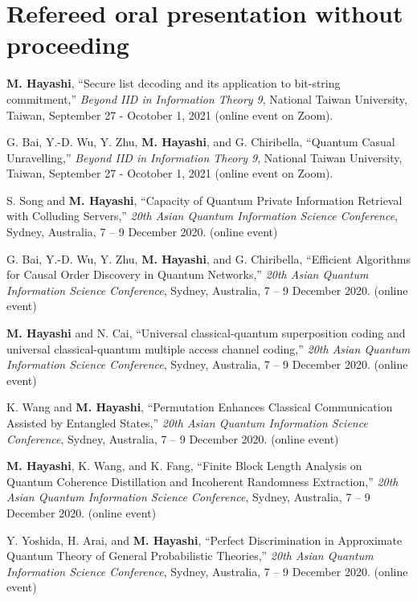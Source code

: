 \documentclass[a4paper,12pt,oneside]{article}
\begin{document}
\section{Refereed oral presentation without proceeding}
\begin{enumerate}

\textbf{M. Hayashi}, 
``Secure list decoding and its application to bit-string commitment,''
{\em Beyond IID in Information Theory 9}, National Taiwan University, Taiwan, September 27 - Ocotober 1, 2021 (online event on Zoom).

G. Bai, Y.-D. Wu, Y. Zhu, \textbf{M. Hayashi}, and G. Chiribella,
``Quantum Casual Unravelling,''
{\em Beyond IID in Information Theory 9}, National Taiwan University, Taiwan, September 27 - Ocotober 1, 2021 (online event on Zoom).

S. Song and \textbf{M. Hayashi},
``Capacity of Quantum Private Information Retrieval with Colluding Servers,''
{\em 20th Asian Quantum Information Science Conference},
Sydney, Australia, 7 -- 9 December 2020. (online event)

G. Bai, Y.-D. Wu, Y. Zhu, \textbf{M. Hayashi}, and G. Chiribella,
``Efficient Algorithms for Causal Order Discovery in Quantum Networks,''
{\em 20th Asian Quantum Information Science Conference},
Sydney, Australia, 7 -- 9 December 2020. (online event)

\textbf{M. Hayashi} and N. Cai,
``Universal classical-quantum superposition coding and universal classical-quantum multiple access channel coding,''
{\em 20th Asian Quantum Information Science Conference},
Sydney, Australia, 7 -- 9 December 2020. (online event)

K. Wang and \textbf{M. Hayashi},
``Permutation Enhances Classical Communication Assisted by Entangled States,''
{\em 20th Asian Quantum Information Science Conference},
Sydney, Australia, 7 -- 9 December 2020. (online event)

\textbf{M. Hayashi}, K. Wang, and K. Fang,
``Finite Block Length Analysis on Quantum Coherence Distillation and Incoherent Randomness Extraction,''
{\em 20th Asian Quantum Information Science Conference},
Sydney, Australia, 7 -- 9 December 2020. (online event)

Y. Yoshida, H. Arai, and \textbf{M. Hayashi},
``Perfect Discrimination in Approximate Quantum Theory of General Probabilistic Theories,''
{\em 20th Asian Quantum Information Science Conference},
Sydney, Australia, 7 -- 9 December 2020. (online event)


\end{enumerate}
\end{document}
